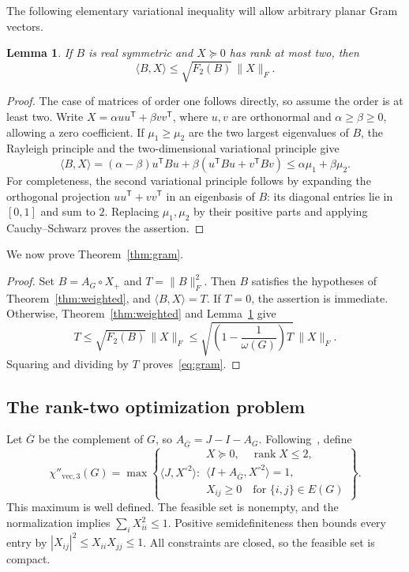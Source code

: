 \documentclass[11pt]{article}
\newtheorem{lemma}[theorem]{Lemma}
\theoremstyle{remark}
\DeclareMathOperator{\rank}{rank}
\newcommand{\F}{F_2}
\newcommand{\ip}[2]{\langle #1,#2\rangle}
\newcommand{\fro}[1]{\lVert #1\rVert_F}
\begin{document}
The following elementary variational inequality will allow arbitrary planar
Gram vectors.

\begin{lemma}\label{lem:variational}
If $B$ is real symmetric and $X\succeq0$ has rank at most two, then
\[
 \ip{B}{X}\le\sqrt{\F(B)}\,\fro{X}.
\]
\end{lemma}
\begin{proof}
The case of matrices of order one follows directly, so assume the order is
at least two. Write
$X=\alpha uu^{\mathsf T}+\beta vv^{\mathsf T}$, where $u,v$ are orthonormal
and $\alpha\ge\beta\ge0$, allowing a zero coefficient.
If $\mu_1\ge\mu_2$ are the two largest eigenvalues of $B$, the Rayleigh
principle and the two-dimensional variational principle give
\[
 \ip{B}{X}
 =(\alpha-\beta)u^{\mathsf T}Bu+
   \beta(u^{\mathsf T}Bu+v^{\mathsf T}Bv)
 \le\alpha\mu_1+\beta\mu_2.
\]
For completeness, the second variational principle follows by expanding the
orthogonal projection $uu^{\mathsf T}+vv^{\mathsf T}$ in an eigenbasis of $B$:
its diagonal entries lie in $[0,1]$ and sum to $2$.
Replacing $\mu_1,\mu_2$ by their positive parts and applying Cauchy--Schwarz
proves the assertion.
\end{proof}

We now prove Theorem~\ref{thm:gram}.
\begin{proof}
Set $B=A_G\circ X_+$ and $T=\fro{B}^2$.
Then $B$ satisfies the hypotheses of Theorem~\ref{thm:weighted}, and
$\ip{B}{X}=T$.
If $T=0$, the assertion is immediate. Otherwise, Theorem~\ref{thm:weighted}
and Lemma~\ref{lem:variational} give
\[
 T\le\sqrt{\F(B)}\,\fro{X}
 \le\sqrt{\left(1-\frac1{\omega(G)}\right)T}\,\fro{X}.
\]
Squaring and dividing by $T$ proves~\eqref{eq:gram}.
\end{proof}

\subsection{The rank-two optimization problem}\label{subsec:conic}

Let $\overline G$ be the complement of $G$, so
$A_{\overline G}=J-I-A_G$.
Following~\cite{CSZ}, define
\begin{equation}\label{eq:parameter}
 \chi''_{\mathrm{vec},3}(G)=
 \max\left\{\ip{J}{X^{\circ2}}:
 \begin{array}{l}
 X\succeq0,\quad\rank X\le2,\\
 \ip{I+A_{\overline G}}{X^{\circ2}}=1,\\
 X_{ij}\ge0\quad\text{for }\{i,j\}\in E(G)
 \end{array}\right\}.
\end{equation}
This maximum is well defined. The feasible set is nonempty, and the
normalization implies $\sum_iX_{ii}^2\le1$.
Positive semidefiniteness then bounds every entry by
$|X_{ij}|^2\le X_{ii}X_{jj}\le1$. All constraints are closed, so the
feasible set is compact.
\end{document}
